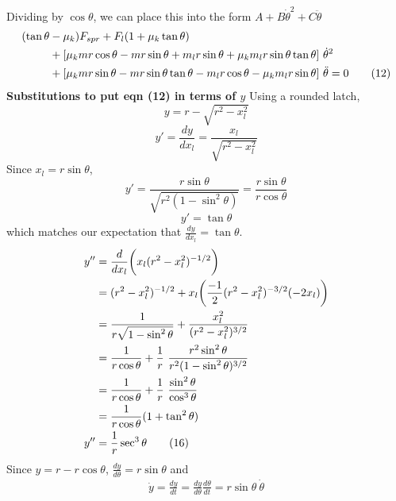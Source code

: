 \documentclass[12pt]{article}
\begin{document}
\newline
Dividing by $\cos{\theta}$, we can place this into the form $A + B \dot{\theta}^2 + C \ddot{\theta}$
\begin{align}
    (\tan{\theta} & - \mu_k) F_{spr} + F_l(1+\mu_k \tan{\theta}) \notag \\
    & + [\mu_k mr \cos{\theta} - mr \sin{\theta} + m_l r \sin{\theta} + \mu_k m_l r \sin{\theta} \tan{\theta}]\ \dot{\theta}^2 \notag \\
    & + [\mu_k mr \sin{\theta} - mr \sin{\theta} \tan{\theta} - m_l r \cos{\theta} - \mu_k m_l r \sin{\theta}]\ \ddot{\theta} = 0 \tag{12}
\end{align}
\newline
\noindent \textbf{Substitutions to put eqn (12) in terms of $y$}
\newline
Using a rounded latch,
\[\tag{13}
    y = r - \sqrt{r^2 - x_l^2}
\]
\[\tag{14}
    y' = \frac{dy}{dx_l} = \frac{x_l}{\sqrt{r^2 - x_l^2}}
\]
Since $x_l = r \sin{\theta}$,
\[
    y' = \frac{r \sin{\theta}}{\sqrt{r^2 (1 - \sin^2{\theta})}} = \frac{r \sin{\theta}}{r \cos{\theta}}
\]
\[\tag{15}
    y' = \tan{\theta}
\]
which matches our expectation that $\frac{dy}{dx_l} = \tan{\theta}$.
\newline
\begin{align}
    y'' & = \frac{d}{dx_l} \biggl( x_l (r^2 - x_l^2)^{-1/2} \biggr) \notag \\
    & = (r^2 - x_l^2)^{-1/2} + x_l \biggl( \frac{-1}{2} (r^2 - x_l^2)^{-3/2} (-2 x_l) \biggr) \notag  \\
    & = \frac{1}{r \sqrt{1 - \sin^2{\theta}}} + \frac{x_l^2}{(r^2 - x_l^2)^{3/2}} \notag \\
    & = \frac{1}{r \cos{\theta}} + \frac{1}{r} \ \frac{r^2 \sin^2{\theta}}{r^2 (1- \sin^2{\theta})^{3/2}} \notag \\
    & = \frac{1}{r \cos{\theta}} + \frac{1}{r} \ \frac{\sin^2{\theta}}{\cos^3{\theta}} \notag \\
    & = \frac{1}{r \cos{\theta}} (1 + \tan^2{\theta}) \notag \\
    y'' & = \frac{1}{r} \sec^3{\theta} \tag{16}
\end{align}
\newline
Since $y = r - r \cos{\theta}$, $\frac{dy}{d\theta} = r \sin{\theta}$ and 
\begin{align}
    \dot{y} = \frac{dy}{dt} = \frac{dy}{d\theta} \frac{d\theta}{dt} = r \sin{\theta} \ \dot{\theta} \tag{17}
\end{align}
\newline
\end{document}
